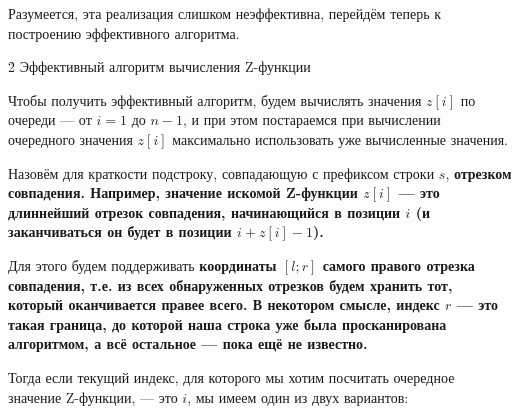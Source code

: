 Разумеется, эта реализация слишком неэффективна, перейдём теперь к построению эффективного алгоритма.


\h2{ Эффективный алгоритм вычисления Z-функции }

Чтобы получить эффективный алгоритм, будем вычислять значения $z[i]$ по очереди --- от $i=1$ до $n-1$, и при этом постараемся при вычислении очередного значения $z[i]$ максимально использовать уже вычисленные значения.

Назовём для краткости подстроку, совпадающую с префиксом строки $s$, \bf{отрезком совпадения}. Например, значение искомой Z-функции $z[i]$ --- это длиннейший отрезок совпадения, начинающийся в позиции $i$ (и заканчиваться он будет в позиции $i + z[i] - 1$).

Для этого будем поддерживать \bf{координаты $[l;r]$ самого правого отрезка совпадения}, т.е. из всех обнаруженных отрезков будем хранить тот, который оканчивается правее всего. В некотором смысле, индекс $r$ --- это такая граница, до которой наша строка уже была просканирована алгоритмом, а всё остальное --- пока ещё не известно.

Тогда если текущий индекс, для которого мы хотим посчитать очередное значение Z-функции, --- это $i$, мы имеем один из двух вариантов:

